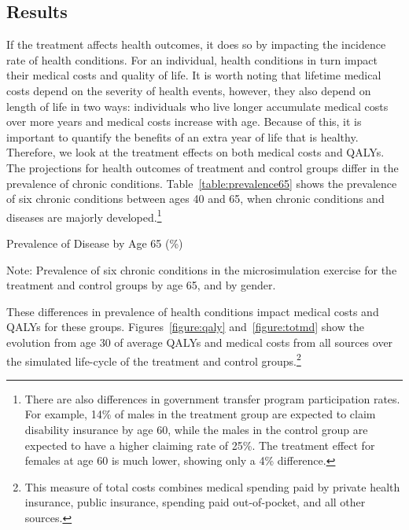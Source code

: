\subsection{Results}

\noindent If the treatment affects health outcomes, it does so by impacting the incidence rate of health conditions. For an individual, health conditions in turn impact their medical costs and quality of life. It is worth noting that lifetime medical costs depend on the severity of health events, however, they also depend on length of life in two ways: individuals who live longer accumulate medical costs over more years and medical costs increase with age. Because of this, it is important to quantify the benefits of an extra year of life that is healthy. Therefore, we look at the treatment effects on both medical costs and QALYs. \\

\noindent The projections for health outcomes of treatment and control groups differ in the prevalence of chronic conditions. Table~\ref{table:prevalence65} shows the prevalence of six chronic conditions between ages 40 and 65, when chronic conditions and diseases are majorly developed.\footnote{There are also differences in government transfer program participation rates. For example, 14\% of males in the treatment group are expected to claim disability insurance by age 60, while the males in the control group are expected to have a higher claiming rate of 25\%. The treatment effect for females at age 60 is much lower, showing only a 4\% difference.} \\

\begin{table}[H]
\begin{threeparttable}
\footnotesize
\caption{Prevalence of Disease by Age 65 (\%)} \label{table:prevalence65}

\begin{tablenotes}
\footnotesize
\item Note: Prevalence of six chronic conditions in the microsimulation exercise for the treatment and control groups by age 65, and by gender.
\end{tablenotes}
\end{threeparttable}
\end{table}

\noindent These differences in prevalence of health conditions impact medical costs and QALYs for these groups. Figures~\ref{figure:qaly} and~\ref{figure:totmd} show the evolution from age 30 of average QALYs and medical costs from all sources over the simulated life-cycle of the treatment and control groups.\footnote{This measure of total costs combines medical spending paid by private health insurance, public insurance, spending paid out-of-pocket, and all other sources.} 

